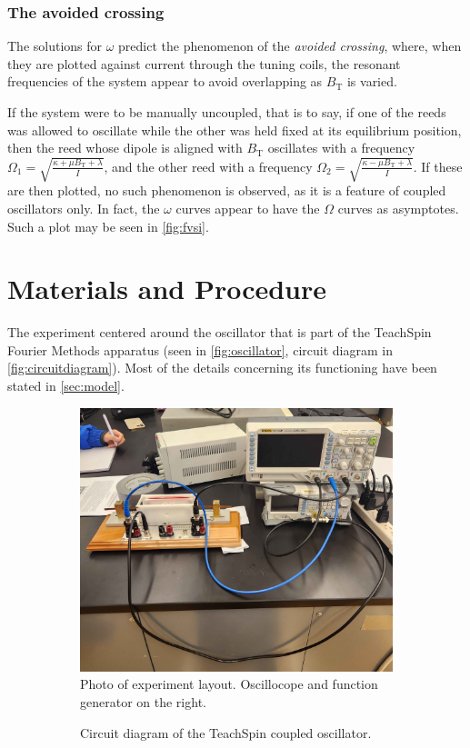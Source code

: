 \documentclass{article}
\begin{document}
\subsubsection{The avoided crossing}
The solutions for $\omega$ predict the phenomenon of the \emph{avoided crossing}, where, when they are plotted against current through the tuning coils, the resonant frequencies of the system appear to avoid overlapping as $B_\text{T}$ is varied.

If the system were to be manually uncoupled, that is to say, if one of the reeds was allowed to oscillate while the other was held fixed at its equilibrium position, then the reed whose dipole is aligned with $B_\text{T}$ oscillates with a frequency $\Omega_1 = \sqrt{\frac{\kappa+\mu B_\text{T}+\lambda}{I}}$, and the other reed with a frequency $\Omega_2 = \sqrt{\frac{\kappa-\mu B_\text{T}+\lambda}{I}}$. If these are then plotted, no such phenomenon is observed, as it is a feature of coupled oscillators only. In fact, the $\omega$ curves appear to have the $\Omega$ curves as asymptotes. Such a plot may be seen in \autoref{fig:fvsi}.

\section{Materials and Procedure}
The experiment centered around the oscillator that is part of the TeachSpin Fourier Methods apparatus (seen in \autoref{fig:oscillator}, circuit diagram in \autoref{fig:circuitdiagram}). Most of the details concerning its functioning have been stated in \autoref*{sec:model}.

\begin{figure}
  \centering
  \begin{subfigure}{.45\textwidth}
    \centering
    \includegraphics[width=.8\linewidth]{setup.jpg}
    \caption{Photo of experiment layout. Oscillocope and function generator on the right.}
    \label{fig:setupphoto}
  \end{subfigure}
  \begin{subfigure}{.45\textwidth}
    \centering
    \def\svgwidth{\linewidth}
    
    \caption{Circuit diagram of the TeachSpin coupled oscillator.}
    \label{fig:circuitdiagram}
  \end{subfigure}
  \caption{}
  \label{setup}
\end{figure}
\end{document}
